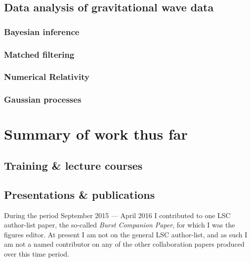 \documentclass{kentigern}
\begin{document}
\chapter{Data analysis of gravitational wave data}
\label{cha:data-analys-grav}


\section{Bayesian inference}
\label{sec:bayesian-inference}


\section{Matched filtering}
\label{sec:matched-filtering}


\section{Numerical Relativity}
\label{sec:numerical-relativity}



\section{Gaussian processes}
\label{sec:gaussian-process}


\part{Summary of work thus far}
\label{part:work}

\chapter{Training \& lecture courses}
\label{chap:lectures}

\chapter{Presentations \& publications}
\label{chap:pandp}

During the period September 2015 --- April 2016 I contributed to one
LSC author-list paper, the so-called \emph{Burst Companion Paper}, for
which I was the figures editor. At present I am not on the general LSC
author-list, and as such I am not a named contributor on any of the
other collaboration papers produced over this time period.
\end{document}
